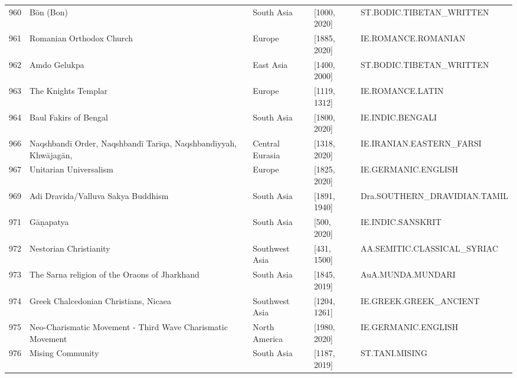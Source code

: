 {\begin{longtable}{rp{3.5cm}llp{3.5cm}}
960 & {\raggedright Bön (Bon)} & South Asia & [1000, 2020] & {\raggedright ST.\allowbreak{}BODIC.\allowbreak{}TIBETAN\_\allowbreak{}WRITTEN} \\
961 & {\raggedright Romanian Orthodox Church} & Europe & [1885, 2020] & {\raggedright IE.\allowbreak{}ROMANCE.\allowbreak{}ROMANIAN} \\
962 & {\raggedright Amdo Gelukpa} & East Asia & [1400, 2000] & {\raggedright ST.\allowbreak{}BODIC.\allowbreak{}TIBETAN\_\allowbreak{}WRITTEN} \\
963 & {\raggedright The Knights Templar} & Europe & [1119, 1312] & {\raggedright IE.\allowbreak{}ROMANCE.\allowbreak{}LATIN} \\
964 & {\raggedright Baul Fakirs of Bengal} & South Asia & [1800, 2020] & {\raggedright IE.\allowbreak{}INDIC.\allowbreak{}BENGALI} \\
966 & {\raggedright Naqshbandī Order, Naqshbandī Tarīqa, Naqshbandīyyah, Khwājagān,} & Central Eurasia & [1318, 2020] & {\raggedright IE.\allowbreak{}IRANIAN.\allowbreak{}EASTERN\_\allowbreak{}FARSI} \\
967 & {\raggedright Unitarian Universalism} & Europe & [1825, 2020] & {\raggedright IE.\allowbreak{}GERMANIC.\allowbreak{}ENGLISH} \\
969 & {\raggedright Adi Dravida/Valluva Sakya Buddhism} & South Asia & [1891, 1940] & {\raggedright Dra.\allowbreak{}SOUTHERN\_\allowbreak{}DRAVIDIAN.\allowbreak{}TAMIL} \\
971 & {\raggedright Gāṇapatya} & South Asia & [500, 2020] & {\raggedright IE.\allowbreak{}INDIC.\allowbreak{}SANSKRIT} \\
972 & {\raggedright Nestorian Christianity} & Southwest Asia & [431, 1500] & {\raggedright AA.\allowbreak{}SEMITIC.\allowbreak{}CLASSICAL\_\allowbreak{}SYRIAC} \\
973 & {\raggedright The Sarna religion of the Oraons of Jharkhand} & South Asia & [1845, 2019] & {\raggedright AuA.\allowbreak{}MUNDA.\allowbreak{}MUNDARI} \\
974 & {\raggedright Greek Chalcedonian Christians, Nicaea} & Southwest Asia & [1204, 1261] & {\raggedright IE.\allowbreak{}GREEK.\allowbreak{}GREEK\_\allowbreak{}ANCIENT} \\
975 & {\raggedright Neo-Charismatic Movement - Third Wave Charismatic Movement} & North America & [1980, 2020] & {\raggedright IE.\allowbreak{}GERMANIC.\allowbreak{}ENGLISH} \\
976 & {\raggedright Mising Community} & South Asia & [1187, 2019] & {\raggedright ST.\allowbreak{}TANI.\allowbreak{}MISING} \\

\end{longtable}}
